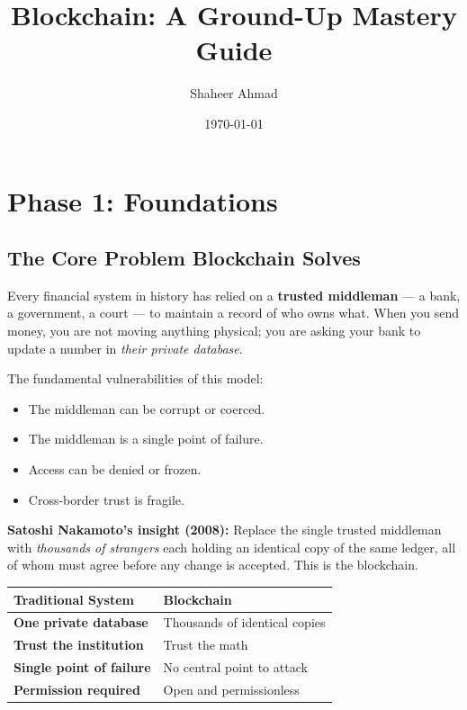 \documentclass[12pt, a4paper]{article}
\title{\textbf{Blockchain: A Ground-Up Mastery Guide}}
\author{Shaheer Ahmad}
\date{\today}
\begin{document}
\maketitle
\tableofcontents
\newpage

\section{Phase 1: Foundations}

\subsection{The Core Problem Blockchain Solves}

Every financial system in history has relied on a \textbf{trusted middleman} --- a bank,
a government, a court --- to maintain a record of who owns what. When you send money,
you are not moving anything physical; you are asking your bank to update a number in
\emph{their private database}.

The fundamental vulnerabilities of this model:
\begin{itemize}
    \item The middleman can be corrupt or coerced.
    \item The middleman is a single point of failure.
    \item Access can be denied or frozen.
    \item Cross-border trust is fragile.
\end{itemize}

\textbf{Satoshi Nakamoto's insight (2008):} Replace the single trusted middleman with
\emph{thousands of strangers} each holding an identical copy of the same ledger, all
of whom must agree before any change is accepted. This is the blockchain.

\begin{center}
\begin{tabular}{>{\bfseries}l l}
\toprule
Traditional System & Blockchain \\
\midrule
One private database & Thousands of identical copies \\
Trust the institution & Trust the math \\
Single point of failure & No central point to attack \\
Permission required & Open and permissionless \\
\bottomrule
\end{tabular}
\end{center}
\end{document}
